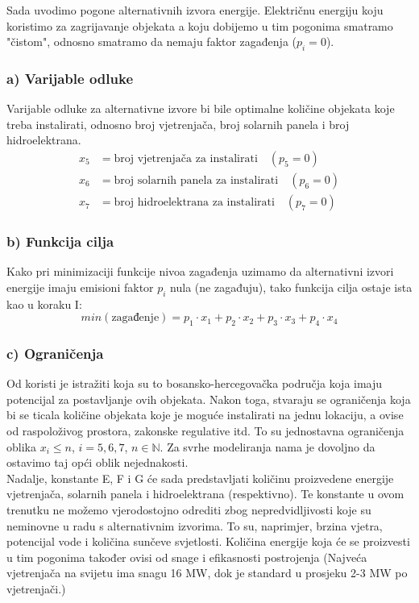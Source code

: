\documentclass[12pt, a4paper]{paper}
\begin{document}
Sada uvodimo pogone alternativnih izvora energije. Električnu energiju koju koristimo za zagrijavanje objekata a koju dobijemo u tim pogonima smatramo "čistom", odnosno smatramo da nemaju faktor zagađenja ($p_i = 0$).

\subsubsection*{a) Varijable odluke}

Varijable odluke za alternativne izvore bi bile optimalne količine objekata koje treba instalirati, odnosno broj vjetrenjača, broj solarnih panela i broj hidroelektrana.
\begin{align*}
    x_5 &= \text{broj vjetrenjača za instalirati} \quad (p_5 = 0) \\
    x_6 &= \text{broj solarnih panela za instalirati} \quad (p_6 = 0) \\
    x_7 &= \text{broj hidroelektrana za instalirati} \quad (p_7 = 0)
\end{align*}

\subsubsection*{b) Funkcija cilja}

Kako pri minimizaciji funkcije nivoa zagađenja uzimamo da alternativni izvori energije imaju emisioni faktor $p_i$ nula (ne zagađuju), tako funkcija cilja ostaje ista kao u koraku I:
\[ min(\text{zagađenje}) = p_1 \cdot x_1 + p_2 \cdot x_2 + p_3 \cdot x_3 + p_4 \cdot x_4 \]

\subsubsection*{c) Ograničenja}

Od koristi je istražiti koja su to bosansko-hercegovačka područja koja imaju potencijal za postavljanje ovih objekata. Nakon toga, stvaraju se ograničenja koja bi se ticala količine objekata koje je moguće instalirati na jednu lokaciju, a ovise od raspoloživog prostora, zakonske regulative itd. To su jednostavna ograničenja oblika $x_i \leq n$, $i=5,6,7$, $n \in \mathbb{N}$. Za svrhe modeliranja nama je dovoljno da ostavimo taj opći oblik nejednakosti.\\

Nadalje, konstante E, F i G će sada predstavljati količinu proizvedene energije vjetrenjača, solarnih panela i hidroelektrana (respektivno). Te konstante u ovom trenutku ne možemo vjerodostojno odrediti zbog nepredvidljivosti koje su neminovne u radu s alternativnim izvorima. To su, naprimjer, brzina vjetra, potencijal vode i količina sunčeve svjetlosti. Količina energije koja će se proizvesti u tim pogonima također ovisi od snage i efikasnosti postrojenja (Najveća vjetrenjača na svijetu ima snagu 16 MW, dok je standard u prosjeku 2-3 MW po vjetrenjači.)\\
\end{document}
